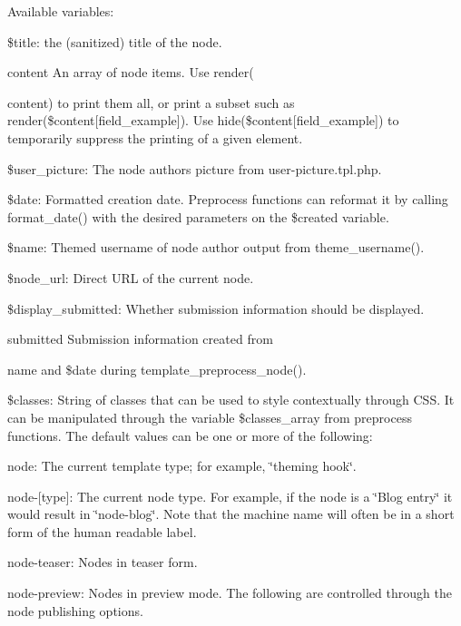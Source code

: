 Available variables\+:
\begin{DoxyItemize}
\item \$title\+: the (sanitized) title of the node.
\item \begin{DoxyParagraph}{content}
An array of node items. Use render(
\end{DoxyParagraph}
content) to print them all, or print a subset such as render(\$content\mbox{[}\textquotesingle{}field\+\_\+example\textquotesingle{}\mbox{]}). Use hide(\$content\mbox{[}\textquotesingle{}field\+\_\+example\textquotesingle{}\mbox{]}) to temporarily suppress the printing of a given element.
\item \$user\+\_\+picture\+: The node author\textquotesingle{}s picture from user-\/picture.\+tpl.\+php.
\item \$date\+: Formatted creation date. Preprocess functions can reformat it by calling format\+\_\+date() with the desired parameters on the \$created variable.
\item \$name\+: Themed username of node author output from theme\+\_\+username().
\item \$node\+\_\+url\+: Direct U\+RL of the current node.
\item \$display\+\_\+submitted\+: Whether submission information should be displayed.
\item \begin{DoxyParagraph}{submitted}
Submission information created from 
\end{DoxyParagraph}
name and \$date during template\+\_\+preprocess\+\_\+node().
\item \$classes\+: String of classes that can be used to style contextually through C\+SS. It can be manipulated through the variable \$classes\+\_\+array from preprocess functions. The default values can be one or more of the following\+:
\begin{DoxyItemize}
\item node\+: The current template type; for example, \char`\"{}theming hook\char`\"{}.
\item node-\/\mbox{[}type\mbox{]}\+: The current node type. For example, if the node is a \char`\"{}\+Blog entry\char`\"{} it would result in \char`\"{}node-\/blog\char`\"{}. Note that the machine name will often be in a short form of the human readable label.
\item node-\/teaser\+: Nodes in teaser form.
\item node-\/preview\+: Nodes in preview mode. The following are controlled through the node publishing options.

\end{DoxyItemize}
\end{DoxyItemize}
